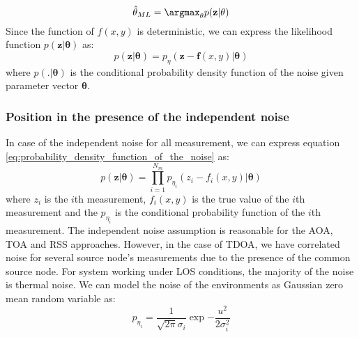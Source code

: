 \documentclass[../templatetop.tex]{subfiles}
\begin{document}
\begin{equation}
    \hat{\mathbf{\theta}}_{ML} = \argmax_{\theta}p(\mathbf{z}|\mathbf{\theta})
\end{equation}
Since the function of $f(x,y)$ is deterministic, we can express the likelihood function $p(\mathbf{z}|\mathbf{\theta})$ as:
\begin{equation}
    p(\mathbf{z}|\mathbf{\theta}) = p_{\eta}(\mathbf{z} - \mathbf{f}(x,y) | \mathbf{\theta}) 
    \label{eq:probability_density_function_of_the_noise}
\end{equation}
where $p(.|\mathbf{\theta})$ is the conditional probability density function of the noise given parameter vector $\mathbf{\theta}$.
\subsubsection*{Position in the presence of the independent noise}
In case of the independent noise for all measurement, we can express equation \ref{eq:probability_density_function_of_the_noise} as:
\begin{equation}
    p(\mathbf{z}|\mathbf{\theta}) = \prod_{i=1}^{N_m}p_{\eta_i}(z_i-f_i(x,y) | \mathbf{\theta})
\end{equation}
where $z_i$ is the $i$th measurement, $f_i(x,y)$ is the true value of the $i$th measurement and the $p_{\eta_i}$ is the conditional probability function of the $i$th measurement. The independent noise assumption is reasonable for the AOA, TOA and RSS approaches. However, in the case of TDOA, we have correlated noise for several source node's measurements due to the presence of the common source node. For system working under LOS conditions, the majority of the noise is thermal noise. We can model the noise of the environments as Gaussian zero mean random variable as:
\begin{equation}
    p_{\eta_i} = \frac{1}{\sqrt{2\pi}\sigma_i}\exp{-\frac{u^2}{2\sigma_i^2}}
\end{equation}
\end{document}

